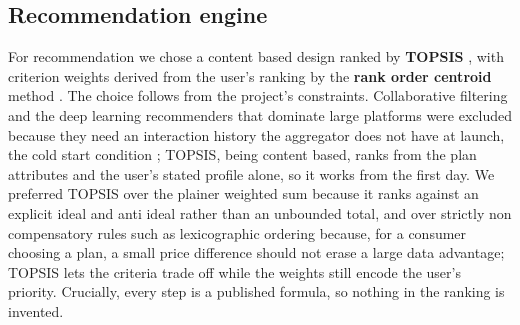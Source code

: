 \subsection{Recommendation engine}

For recommendation we chose a content based design ranked by \textbf{TOPSIS} \parencite{HwangYoon1981, TaherdoostMadanchian2023}, with criterion weights derived from the user's ranking by the \textbf{rank order centroid} method \parencite{BarronBarrett1996}. The choice follows from the project's constraints. Collaborative filtering and the deep learning recommenders that dominate large platforms were excluded because they need an interaction history the aggregator does not have at launch, the cold start condition \parencite{AdomaviciusTuzhilin2005, ZhangColdStart2025}; TOPSIS, being content based, ranks from the plan attributes and the user's stated profile alone, so it works from the first day. We preferred TOPSIS over the plainer weighted sum because it ranks against an explicit ideal and anti ideal rather than an unbounded total, and over strictly non compensatory rules such as lexicographic ordering \parencite{Fishburn1974} because, for a consumer choosing a plan, a small price difference should not erase a large data advantage; TOPSIS lets the criteria trade off while the weights still encode the user's priority. Crucially, every step is a published formula, so nothing in the ranking is invented.

